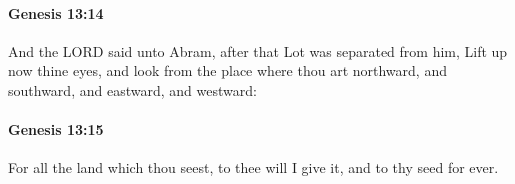 		\paragraph{Genesis 13:14} %
			\label{GENESIS-13-14}

			And the LORD said unto Abram, after that Lot was separated from him, Lift up now thine eyes, and look from the place where thou art northward, and southward, and eastward, and westward:


		\paragraph{Genesis 13:15} %
			\label{GENESIS-13-15}

			For all the land which thou seest, to thee will I give it, and to thy seed for ever.


